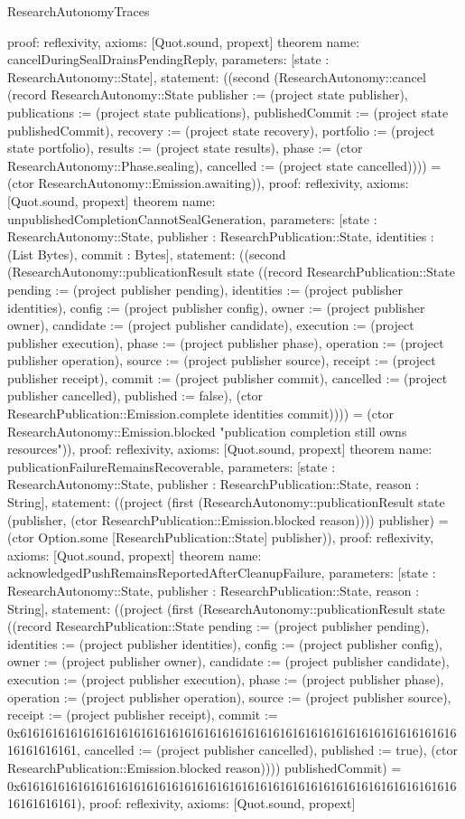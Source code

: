 \begin{lexlean}{ResearchAutonomyTraces}
\begin{semanticmodule}
{ proof: reflexivity{},
 axioms: [Quot.sound, propext]
}
theorem{
 name: cancelDuringSealDrainsPendingReply,
 parameters: [state : ResearchAutonomy::State],
 statement: ((second (ResearchAutonomy::cancel (record ResearchAutonomy::State {publisher := (project state publisher), publications := (project state publications), publishedCommit := (project state publishedCommit), recovery := (project state recovery), portfolio := (project state portfolio), results := (project state results), phase := (ctor ResearchAutonomy::Phase.sealing), cancelled := (project state cancelled)}))) = (ctor ResearchAutonomy::Emission.awaiting)),
 proof: reflexivity{},
 axioms: [Quot.sound, propext]
}
theorem{
 name: unpublishedCompletionCannotSealGeneration,
 parameters: [state : ResearchAutonomy::State, publisher : ResearchPublication::State, identities : (List Bytes), commit : Bytes],
 statement: ((second (ResearchAutonomy::publicationResult state ((record ResearchPublication::State {pending := (project publisher pending), identities := (project publisher identities), config := (project publisher config), owner := (project publisher owner), candidate := (project publisher candidate), execution := (project publisher execution), phase := (project publisher phase), operation := (project publisher operation), source := (project publisher source), receipt := (project publisher receipt), commit := (project publisher commit), cancelled := (project publisher cancelled), published := false}), (ctor ResearchPublication::Emission.complete identities commit)))) = (ctor ResearchAutonomy::Emission.blocked "publication completion still owns resources")),
 proof: reflexivity{},
 axioms: [Quot.sound, propext]
}
theorem{
 name: publicationFailureRemainsRecoverable,
 parameters: [state : ResearchAutonomy::State, publisher : ResearchPublication::State, reason : String],
 statement: ((project (first (ResearchAutonomy::publicationResult state (publisher, (ctor ResearchPublication::Emission.blocked reason)))) publisher) = (ctor Option.some [ResearchPublication::State] publisher)),
 proof: reflexivity{},
 axioms: [Quot.sound, propext]
}
theorem{
 name: acknowledgedPushRemainsReportedAfterCleanupFailure,
 parameters: [state : ResearchAutonomy::State, publisher : ResearchPublication::State, reason : String],
 statement: ((project (first (ResearchAutonomy::publicationResult state ((record ResearchPublication::State {pending := (project publisher pending), identities := (project publisher identities), config := (project publisher config), owner := (project publisher owner), candidate := (project publisher candidate), execution := (project publisher execution), phase := (project publisher phase), operation := (project publisher operation), source := (project publisher source), receipt := (project publisher receipt), commit := 0x61616161616161616161616161616161616161616161616161616161616161616161616161616161, cancelled := (project publisher cancelled), published := true}), (ctor ResearchPublication::Emission.blocked reason)))) publishedCommit) = 0x61616161616161616161616161616161616161616161616161616161616161616161616161616161),
 proof: reflexivity{},
 axioms: [Quot.sound, propext]
}
\end{semanticmodule}
\end{lexlean}

